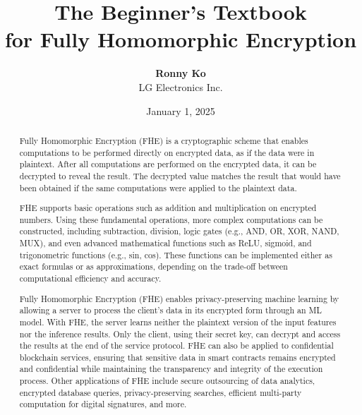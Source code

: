 \documentclass[11pt]{article}
\begin{document}
\title{\Huge{\textbf{The Beginner's Textbook}}\\ \Huge{\textbf{for Fully Homomorphic Encryption}}}
\author{\textbf{Ronny Ko}\\{LG Electronics Inc.}}%
\date{January 1, 2025}



\begin{titlingpage}
\maketitle
\end{titlingpage}


\clearpage

\begin{abstract}
Fully Homomorphic Encryption (FHE) is a cryptographic scheme that enables computations to be performed directly on encrypted data, as if the data were in plaintext. After all computations are performed on the encrypted data, it can be decrypted to reveal the result. The decrypted value matches the result that would have been obtained if the same computations were applied to the plaintext data.

FHE supports basic operations such as addition and multiplication on encrypted numbers. Using these fundamental operations, more complex computations can be constructed, including subtraction, division, logic gates (e.g., AND, OR, XOR, NAND, MUX), and even advanced mathematical functions such as ReLU, sigmoid, and trigonometric functions (e.g., sin, cos). These functions can be implemented either as exact formulas or as approximations, depending on the trade-off between computational efficiency and accuracy. 

Fully Homomorphic Encryption (FHE) enables privacy-preserving machine learning by allowing a server to process the client’s data in its encrypted form through an ML model. With FHE, the server learns neither the plaintext version of the input features nor the inference results. Only the client, using their secret key, can decrypt and access the results at the end of the service protocol.
FHE can also be applied to confidential blockchain services, ensuring that sensitive data in smart contracts remains encrypted and confidential while maintaining the transparency and integrity of the execution process.
Other applications of FHE include secure outsourcing of data analytics, encrypted database queries, privacy-preserving searches, efficient multi-party computation for digital signatures, and more.


\end{abstract}
\end{document}
